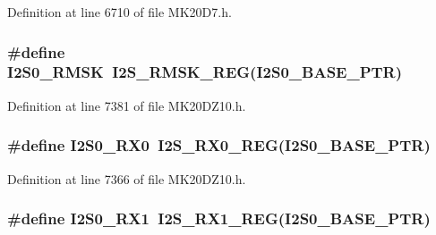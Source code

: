 Definition at line 6710 of file M\+K20\+D7.\+h.

\subsubsection[{\texorpdfstring{I2\+S0\+\_\+\+R\+M\+SK}{I2S0_RMSK}}]{\setlength{\rightskip}{0pt plus 5cm}\#define I2\+S0\+\_\+\+R\+M\+SK~{\bf I2\+S\+\_\+\+R\+M\+S\+K\+\_\+\+R\+EG}({\bf I2\+S0\+\_\+\+B\+A\+S\+E\+\_\+\+P\+TR})}\hypertarget{group___i2_s___register___accessor___macros_ga52e2252501659e745c191f1d6932612f}{}\label{group___i2_s___register___accessor___macros_ga52e2252501659e745c191f1d6932612f}


Definition at line 7381 of file M\+K20\+D\+Z10.\+h.

\subsubsection[{\texorpdfstring{I2\+S0\+\_\+\+R\+X0}{I2S0_RX0}}]{\setlength{\rightskip}{0pt plus 5cm}\#define I2\+S0\+\_\+\+R\+X0~{\bf I2\+S\+\_\+\+R\+X0\+\_\+\+R\+EG}({\bf I2\+S0\+\_\+\+B\+A\+S\+E\+\_\+\+P\+TR})}\hypertarget{group___i2_s___register___accessor___macros_ga149926788352384525be2888ebf1d7c1}{}\label{group___i2_s___register___accessor___macros_ga149926788352384525be2888ebf1d7c1}


Definition at line 7366 of file M\+K20\+D\+Z10.\+h.

\subsubsection[{\texorpdfstring{I2\+S0\+\_\+\+R\+X1}{I2S0_RX1}}]{\setlength{\rightskip}{0pt plus 5cm}\#define I2\+S0\+\_\+\+R\+X1~{\bf I2\+S\+\_\+\+R\+X1\+\_\+\+R\+EG}({\bf I2\+S0\+\_\+\+B\+A\+S\+E\+\_\+\+P\+TR})}\hypertarget{group___i2_s___register___accessor___macros_ga45a78692a6fab10a962d11f370665584}{}\label{group___i2_s___register___accessor___macros_ga45a78692a6fab10a962d11f370665584}


